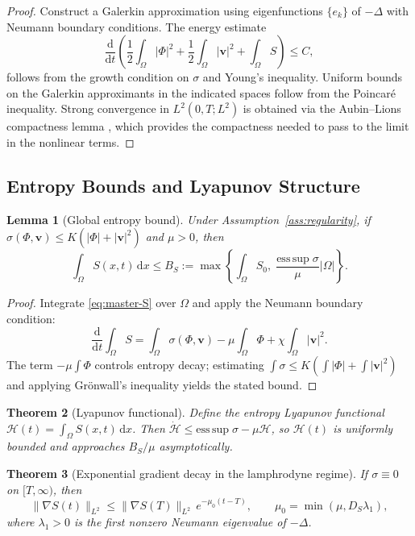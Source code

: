 \documentclass[12pt, a4paper]{article}
\theoremstyle{plain}
\newtheorem{theorem}{Theorem}[section]
\newtheorem{lemma}[theorem]{Lemma}
\theoremstyle{definition}
\theoremstyle{remark}
\newcommand{\vfield}{\mathbf{v}}
\begin{document}
\begin{proof}
Construct a Galerkin approximation using eigenfunctions $\{e_k\}$ of $-\Delta$ with
Neumann boundary conditions.  The energy estimate
\[
\frac{\mathrm{d}}{\mathrm{d}t}\left(\frac{1}{2}\int_\Omega|\Phi|^2
+ \frac{1}{2}\int_\Omega|\vfield|^2 + \int_\Omega S\right) \leq C,
\]
follows from the growth condition on $\sigma$ and Young's inequality.  Uniform bounds on
the Galerkin approximants in the indicated spaces follow from the Poincaré inequality.
Strong convergence in $L^2(0,T;L^2)$ is obtained via the Aubin--Lions compactness lemma
\cite{Lions1969}, which provides the compactness needed to pass to the limit in the
nonlinear terms.
\end{proof}

\subsection{Entropy Bounds and Lyapunov Structure}

\begin{lemma}[Global entropy bound]
\label{lem:entropybound}
Under Assumption~\ref{ass:regularity}, if $\sigma(\Phi,\vfield) \leq K(|\Phi| + |\vfield|^2)$
and $\mu > 0$, then
\[
\int_\Omega S(x,t)\,\mathrm{d}x \leq B_S
:= \max\!\left\{\int_\Omega S_0,\;\frac{\mathrm{ess\,sup}\;\sigma}{\mu}|\Omega|\right\}.
\]
\end{lemma}

\begin{proof}
Integrate \eqref{eq:master-S} over $\Omega$ and apply the Neumann boundary condition:
\[
\frac{\mathrm{d}}{\mathrm{d}t}\int_\Omega S = \int_\Omega \sigma(\Phi,\vfield)
- \mu\int_\Omega\Phi + \chi\int_\Omega|\vfield|^2.
\]
The term $-\mu\int\Phi$ controls entropy decay; estimating $\int\sigma \leq K(\int|\Phi| + \int|\vfield|^2)$
and applying Grönwall's inequality yields the stated bound.
\end{proof}

\begin{theorem}[Lyapunov functional]
\label{thm:lyapunov}
Define the entropy Lyapunov functional $\mathcal{H}(t) = \int_\Omega S(x,t)\,\mathrm{d}x$.
Then $\dot{\mathcal{H}} \leq \mathrm{ess\,sup}\;\sigma - \mu\mathcal{H}$, so
$\mathcal{H}(t)$ is uniformly bounded and approaches $B_S/\mu$ asymptotically.
\end{theorem}

\begin{theorem}[Exponential gradient decay in the lamphrodyne regime]
\label{thm:gradientdecay}
If $\sigma \equiv 0$ on $[T,\infty)$, then
\[
\|\nabla S(t)\|_{L^2} \leq \|\nabla S(T)\|_{L^2}\,e^{-\mu_0(t-T)},
\qquad \mu_0 = \min(\mu, D_S\lambda_1),
\]
where $\lambda_1 > 0$ is the first nonzero Neumann eigenvalue of $-\Delta$.
\end{theorem}
\end{document}
